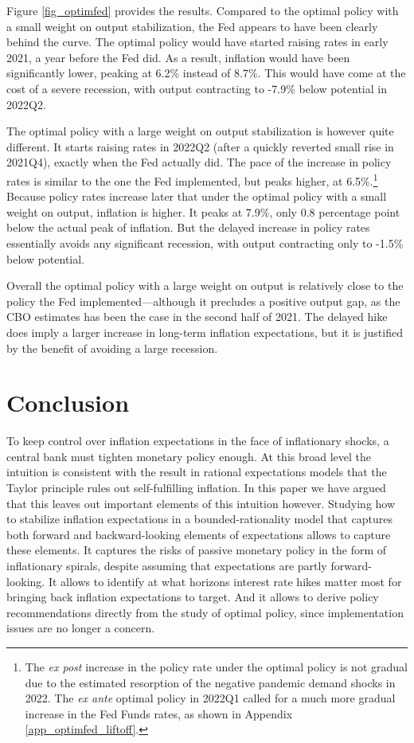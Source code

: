 \documentclass{article}
\begin{document}
Figure \ref{fig_optimfed} provides the results. Compared to the optimal policy with a small weight on output stabilization, the Fed appears to have been clearly behind the curve. The optimal policy would have started raising rates in early 2021, a year before the Fed did. As a result, inflation would have been significantly lower, peaking at 6.2\% instead of 8.7\%. This would have come at the cost of a severe recession, with output contracting to -7.9\% below potential in 2022Q2.

The optimal policy with a large weight on output stabilization is however quite different. It starts raising rates in 2022Q2 (after a quickly reverted small rise in 2021Q4), exactly when the Fed actually did. The pace of the increase in policy rates is similar to the one the Fed implemented, but peaks higher, at 6.5\%.\footnote{The \emph{ex post} increase in the policy rate under the optimal policy is not gradual due to the estimated resorption of the negative pandemic demand shocks in 2022. The \emph{ex ante} optimal policy in 2022Q1 called for a much more gradual increase in the Fed Funds rates, as shown in Appendix \ref{app_optimfed_liftoff}.} Because policy rates increase later that under the optimal policy with a small weight on output, inflation is higher. It peaks at 7.9\%, only 0.8 percentage point below the actual peak of inflation. But the delayed increase in policy rates essentially avoids any significant recession, with output contracting only to -1.5\% below potential.

Overall the optimal policy with a large weight on output is relatively close to the policy the Fed implemented---although it precludes a positive output gap, as the CBO estimates has been the case in the second half of 2021. The delayed hike does imply a larger increase in long-term inflation expectations, but it is justified by the benefit of avoiding a large recession.

\section{Conclusion}
To keep control over inflation expectations in the face of inflationary shocks, a central bank must tighten monetary policy enough. At this broad level the intuition is consistent with the result in rational expectations models that the Taylor principle rules out self-fulfilling inflation. In this paper we have argued that this leaves out important elements of this intuition however. Studying how to stabilize inflation expectations in a bounded-rationality model that captures both forward and backward-looking elements of expectations allows to capture these elements. It captures the risks of passive monetary policy in the form of inflationary spirals, despite assuming that expectations are partly forward-looking. It allows to identify at what horizons interest rate hikes matter most for bringing back inflation expectations to target. And it allows to derive policy recommendations directly from the study of optimal policy, since implementation issues are no longer a concern.
\end{document}
